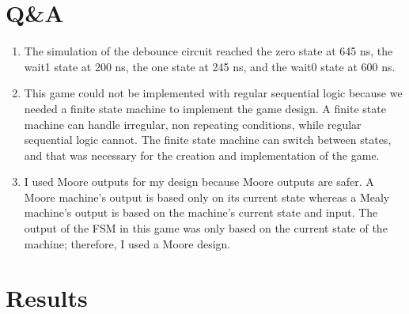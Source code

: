 \documentclass[11pt]{article}
\begin{document}
\section*{Q\&A}
\bigskip

\begin{enumerate}
	\item The simulation of the debounce circuit reached the zero state at 645 ns, the wait1 state at 200 ns, the one state at 245 ns, and the wait0 state at 600 ns. 
	\pagebreak 
	
	\item This game could not be implemented with regular sequential logic because we needed a finite state machine to implement the game design. A finite state machine can handle irregular, non repeating conditions, while regular sequential logic cannot. The finite state machine can switch between states, and that was necessary for the creation and implementation of the game.
	\bigskip 
	
	\item I used Moore outputs for my design because Moore outputs are safer. A Moore machine's output is based only on its current state whereas a Mealy machine's output is based on the machine's current state and input. The output of the FSM in this game was only based on the current state of the machine; therefore, I used a Moore design.  
\end{enumerate}

\bigskip 

\section*{Results}
\end{document}
